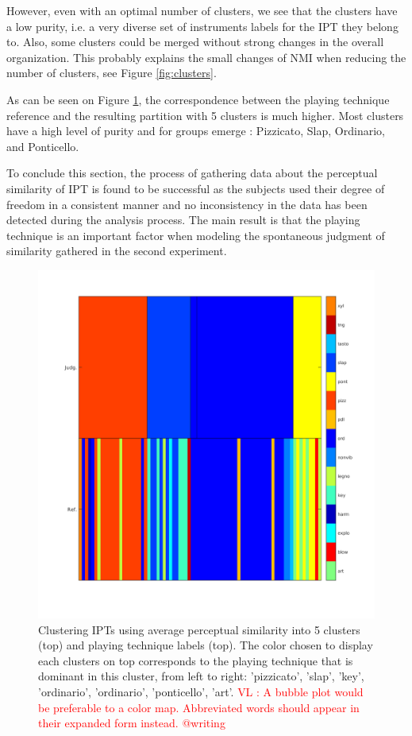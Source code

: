 \documentclass{article}
\makeatletter
\newcommand*{\ie}{i.e.\@\xspace}
\newcommand{\ipt}{IPT\xspace}
\newcommand{\ipts}{IPTs\xspace}
\newcommand{\vl}[1]{\textcolor{red}{VL : #1}}
\makeatother
\begin{document}
However, even with an optimal number of clusters, we see that the clusters have  a low purity, \ie{} a very diverse set of instruments labels for the \ipt they belong to. Also, some clusters could be merged without strong changes in the overall organization. This probably explains the small changes of NMI when reducing the number of clusters, see Figure \ref{fig:clusters}.

As can be seen on Figure \ref{fig:gm}, the correspondence between the playing technique reference and the resulting partition with 5 clusters is much higher. Most clusters have a high level of purity and for groups emerge : Pizzicato, Slap, Ordinario, and Ponticello.

To conclude this section, the process of gathering data about the perceptual similarity of \ipt is found to be successful as the subjects used their degree of freedom in a consistent manner and no inconsistency in the data has been detected during the analysis process. The main result is that the playing technique is an important factor when modeling the spontaneous judgment of similarity gathered in the second experiment.


\begin{figure}
\center
\includegraphics[width = \textwidth]{figures/groupModes.png}
\caption{Clustering \ipts using average perceptual similarity into 5 clusters (top) and playing technique labels (top). The color chosen to display each clusters on top corresponds to the playing technique that is dominant in this cluster, from left to right: 'pizzicato', 'slap', 'key', 'ordinario', 'ordinario', 'ponticello', 'art'.
\vl{A bubble plot would be preferable to a color map. Abbreviated words should appear in their expanded form instead. @writing}}
\label{fig:gm}
\end{figure}
\end{document}

